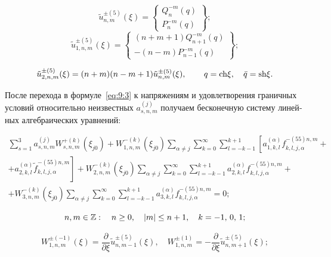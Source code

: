 \begin{russian}
\begin{equation}
\tilde u_{n,m}^{ \pm (5)}(\xi ) = \left\{ \begin{array}{l}
Q_n^{ - m}(q)\\
P_n^{ - m}(q)
\end{array} \right\};
\end{equation}
\begin{equation}
\tilde u_{1,n,m}^{ \pm (5)}(\xi ) = \left\{ \begin{array}{l}
(n + m + 1)Q_{n + 1}^{ - m}(q)\\
 - (n - m)P_{n - 1}^{ - m}(q)
\end{array} \right\};
\end{equation}

\begin{equation}
\tilde u_{2,n,m}^{ \pm (5)}(\xi ) = (n + m)(n - m + 1)\tilde u_{n,m}^{ \pm (5)}(\xi ),\qquad {\kern 1pt} q = {\mathop{\rm ch}\nolimits} \xi ,\quad \bar q = {\mathop{\rm sh}\nolimits} \xi.
\end{equation}

После перехода в формуле~\eqref{eq:9:3} к напряжениям и удовлетворения граничных условий относительно неизвестных $a_{s,n,m}^{(j)}$ получаем бесконечную систему линейных алгебраических уравнений:

\begin{multline}
\sum\limits_{s = 1}^3 {a_{s,n,m}^{(j)}} W_{s,n,m}^{ + (k)}({\xi _{j0}}) + W_{1,n,m}^{ - (k)}({\xi _{j0}})\sum\limits_{\alpha  \ne j} {\sum\limits_{k = 0}^\infty  {\sum\limits_{l =  - k - 1}^{k + 1} {\left[ {a_{1,k,l}^{(\alpha )}f_{k,l,j,\alpha }^{ - (55)n,m} + } \right.} } } \\
\left. { + a_{2,k,l}^{(\alpha )}\tilde f_{k,l,j,\alpha }^{ - (55)n,m}} \right] + W_{2,n,m}^{ - (k)}({\xi _{j0}})\sum\limits_{\alpha  \ne j} {\sum\limits_{k = 0}^\infty  {\sum\limits_{l =  - k - 1}^{k + 1} {a_{2,k,l}^{(\alpha )}} } f_{k,l,j,\alpha }^{ - (55)n,m} + } \\
+ W_{3,n,m}^{ - (k)}({\xi _{j0}})\sum\limits_{\alpha  \ne j} {\sum\limits_{k = 0}^\infty  {\sum\limits_{l =  - k - 1}^{k + 1} {a_{3,k,l}^{(\alpha )}} } f_{k,l,j,\alpha }^{ - (55)n,m} = 0;}
\label{eq:9:24}
\end{multline}

$$
n,m \in\mathbb{Z}:\quad n \ge 0,\quad |m| \le n + 1,\quad k =  - 1,{\mkern 1mu} {\kern 1pt} 0,{\mkern 1mu} {\kern 1pt} 1;
$$

\begin{equation}
W_{1,n,m}^{ \pm ( - 1)}(\xi ) = \frac{\partial }{{\partial \xi }}\tilde u_{n,m - 1}^{ \pm (5)}(\xi ),\quad W_{1,n,m}^{ \pm (1)} =  - \frac{\partial }{{\partial \xi }}\tilde u_{n,m + 1}^{ \pm (5)}(\xi );
\label{eq:9:15}
\end{equation}


\end{russian}
